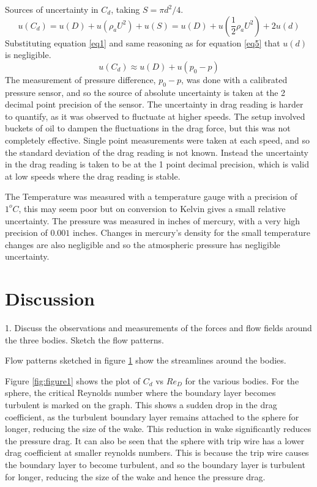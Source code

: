 \documentclass[8pt]{article}
\begin{document}
Sources of uncertainty in $C_d$, taking $S=\pi d^2/4$.
\begin{equation}
    u(C_d) = u(D) + u(\rho_a U^2) + u(S) = u(D) + u(\frac{1}{2}\rho_a U^2) + 2u(d)
\end{equation}
Substituting equation \ref{eq1} and same reasoning as for equation \ref{eq5} that $u(d)$ is negligible.
\begin{equation}
    u(C_d) \approx u(D) + u(p_0-p)
\end{equation}
The measurement of pressure difference, $p_0-p$, was done with a calibrated pressure sensor, and so the source of absolute uncertainty is taken at the 2 decimal point precision of the sensor.
The uncertainty in drag reading is harder to quantify, as it was observed to fluctuate at higher speeds.
The setup involved buckets of oil to dampen the fluctuations in the drag force, but this was not completely effective.
Single point measurements were taken at each speed, and so the standard deviation of the drag reading is not known.
Instead the uncertainty in the drag reading is taken to be at the 1 point decimal precision, 
which is valid at low speeds where the drag reading is stable.

The Temperature was measured with a temperature gauge with a precision of $1^oC$, this may seem poor but on conversion to Kelvin gives a small relative uncertainty.
The pressure was measured in inches of mercury, with a very high precision of $0.001$ inches.
Changes in mercury's density for the small temperature changes are also negligible and so the atmospheric pressure has negligible uncertainty.

\section{Discussion}

1. Discuss the observations and measurements of the forces and flow fields around the three
bodies. Sketch the flow patterns.

Flow patterns sketched in figure \ref{} show the streamlines around the bodies.

Figure \ref{fig:figure1} shows the plot of $C_d$ vs $Re_D$ for the various bodies. 
For the sphere, the critical Reynolds number where the boundary layer becomes turbulent is marked on the graph.
This shows a sudden drop in the drag coefficient, as the turbulent boundary layer remains attached to the sphere for longer, reducing the size of the wake.
This reduction in wake significantly reduces the pressure drag.
It can also be seen that the sphere with trip wire has a lower drag coefficient at smaller reynolds numbers.
This is because the trip wire causes the boundary layer to become turbulent, and so the boundary layer is turbulent for longer, reducing the size of the wake and hence the pressure drag.
\end{document}
